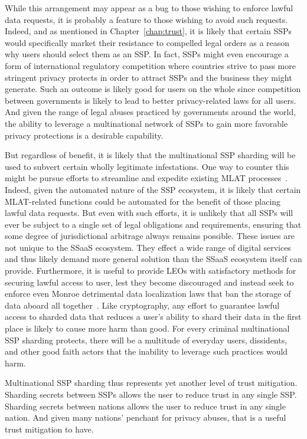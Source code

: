 While this arrangement may appear as a bug to those wishing to enforce
lawful data requests, it is probably a feature to those wishing to
avoid such requests. Indeed, and as mentioned in
Chapter~\ref{chap:trust}, it is likely that certain SSPs would
specifically market their resistance to compelled legal orders as a
reason why users should select them as an SSP. In fact, SSPs might
even encourage a form of international regulatory competition where
countries strive to pass more stringent privacy protects in order to
attract SSPs and the business they might generate. Such an outcome is
likely good for users on the whole since competition between
governments is likely to lead to better privacy-related laws for all
users. And given the range of legal abuses practiced by governments
around the world, the ability to leverage a multinational network of
SSPs to gain more favorable privacy protections is a desirable
capability.

But regardless of benefit, it is likely that the multinational SSP
sharding will be used to subvert certain wholly legitimate
infestations. One way to counter this might be pursue efforts to
streamline and expedite existing MLAT
processes~\cite{nojeim2015}. Indeed, given the automated nature of the
SSP ecosystem, it is likely that certain MLAT-related functions could
be automated for the benefit of those placing lawful data
requests. But even with such efforts, it is unlikely that all SSPs
will ever be subject to a single set of legal obligations and
requirements, ensuring that some degree of jurisdictional arbitrage
always remains possible. These issues are not unique to the SSaaS
ecosystem. They effect a wide range of digital services and thus
likely demand more general solution than the SSaaS ecosystem itself
can provide. Furthermore, it is useful to provide LEOs with
satisfactory methods for securing lawful access to user, lest they
become discouraged and instead seek to enforce even Monroe detrimental
data localization laws that ban the storage of data aboard all
together~\cite{whitehouse2013}. Like cryptography, any effort to
guarantee lawful access to sharded data that reduces a user's ability
to shard their data in the first place is likely to cause more harm
than good. For every criminal multinational SSP sharding protects,
there will be a multitude of everyday users, dissidents, and other
good faith actors that the inability to leverage such practices would
harm.

Multinational SSP sharding thus represents yet another level of trust
mitigation. Sharding secrets between SSPs allows the user to reduce
trust in any single SSP. Sharding secrets between nations allows the
user to reduce trust in any single nation. And given many nations'
penchant for privacy abuses, that is a useful trust mitigation to
have.

